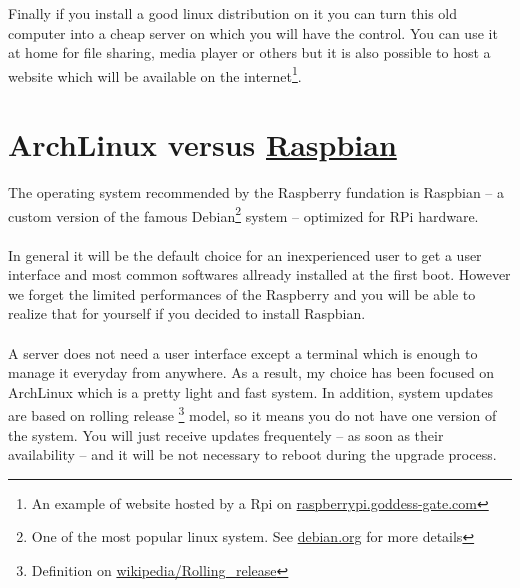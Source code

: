 Finally if you install a good linux distribution on it you can turn this old computer
into a cheap server on which you will have the control. You can use it 
at home for file sharing, media player or others but it is also possible
to host a website which will be available on the internet\footnote{An example
of website hosted by a Rpi on \href{http://raspberrypi.goddess-gate.com}
{raspberrypi.goddess-gate.com}}.

	\section{ArchLinux versus \href{http://www.raspbian.org}{Raspbian}}
	\label{section:ArchVsRaspbian}
The operating system recommended by the Raspberry fundation is Raspbian -- a custom version of the famous Debian\footnote{One of the most popular linux 
system. See \href{https://www.debian.org/intro/about}{debian.org} for more details} system -- optimized for RPi hardware. 
\\\\
In general it will be the default choice for an inexperienced user to get
a user interface and most common softwares allready installed at the first boot.
However we forget the limited performances of the Raspberry and you will be able to realize that for yourself if you decided to install Raspbian. 
\\\\
A server does not need a user interface except a terminal which is enough 
to manage it everyday from anywhere. As a result, my choice has been focused 
on ArchLinux which is a pretty light and fast system. In addition, system 
updates are based on rolling release \footnote{Definition on \href{http://
en.wikipedia.org/wiki/Rolling\_release}{wikipedia/Rolling\_release}} model, 
so it means you do not have one version of the system. You will just receive 
updates frequentely -- as soon as their availability -- and it will be not 
necessary to reboot during the upgrade process.

